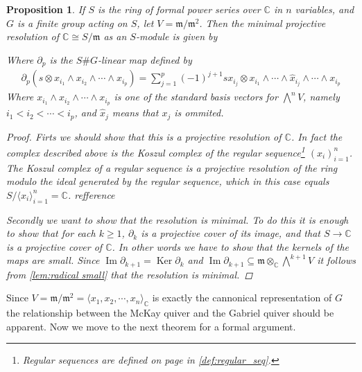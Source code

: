 \documentclass[11pt, a4paper, english]{article}
\newtheorem{prop}{Proposition}
\numberwithin{prop}{section}
\numberwithin{lemma}{section}
\numberwithin{theorem}{section}
\numberwithin{defin}{section}
\numberwithin{example}{section}
\newcommand{\C}{\mathbb{C}}
\DeclareMathOperator{\Image}{Im}
\DeclareMathOperator{\Ker}{Ker}
\begin{document}
\begin{prop}
If $S$ is the ring of formal power series over $\C$ in $n$ variables, and $G$ is a finite group acting on $S$, let $V=\mathfrak{m}/\mathfrak{m}^2$. Then the minimal projective resolution of $\C \cong S/\mathfrak{m}$ as an $S$-module is given by
\begin{center}
\end{center}
Where $\partial_p$ is the $S\#G$-linear map defined by
\begin{align*}
\partial_p(s \otimes x_{i_1} \wedge x_{i_2} \wedge \cdots \wedge x_{i_p}) = \sum_{j=1}^{p} (-1)^{j+1} sx_{i_j} \otimes x_{i_1} \wedge \cdots \wedge \hat{x}_{i_{j}} \wedge \cdots \wedge x_{i_{p}} 
\end{align*}
Where $x_{i_1} \wedge x_{i_2} \wedge \cdots \wedge x_{i_p}$ is one of the standard basis vectors for $\bigwedge\limits^n V$, namely $i_1 < i_2 < \cdots < i_p$, and  $\hat{x}_j$ means that $x_j$ is ommited.

\begin{proof}
Firts we should show that this is a projective resolution of $\C$. In fact the complex described above is the Koszul complex of the regular sequence\footnote{Regular sequences are defined on page \pageref{def:regular_seq} in \cref{def:regular_seq}.} $(x_i)_{i=1}^n$. The Koszul complex of a regular sequence is a projective resolution of the ring modulo the ideal generated by the regular sequence, which in this case equals $S/\langle x_i \rangle_{i=1}^n = \C$. {\color{red} refference}

Secondly we want to show that the resolution is minimal. To do this it is enough to show that for each $k \geq 1$, $\partial_k$ is a projective cover of its image, and that $S \to \C$ is a projective cover of $\C$. In other words we have to show that the kernels of the maps are small. Since $\Image \partial_{k+1} = \Ker \partial_k$ and $\Image \partial_{k+1} \subseteq \mathfrak{m} \otimes_\C \bigwedge\limits^{k+1}V$ it follows from \cref{lem:radical small} that the resolution is minimal.
\end{proof}
\end{prop}

Since $V = \mathfrak{m}/\mathfrak{m}^2 = \langle x_1, x_2, \cdots, x_n \rangle_\C$ is exactly the cannonical representation of $G$ the relationship between the McKay quiver and the Gabriel quiver should be apparent. Now we move to the next theorem for a formal argument.
\end{document}

